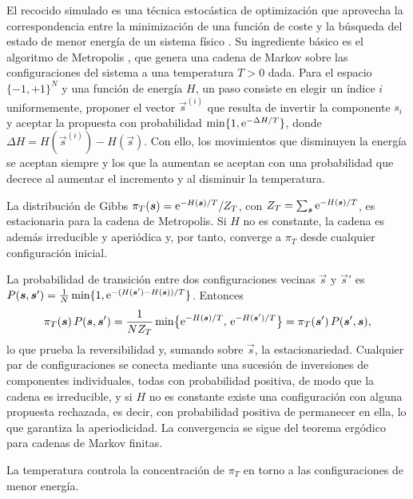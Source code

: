 El recocido simulado es una técnica estocástica de optimización que aprovecha la correspondencia entre la minimización de una función de coste y la búsqueda del estado de menor energía de un sistema físico \parencite{kirkpatrick1983}. Su ingrediente básico es el algoritmo de Metropolis \parencite{metropolis1953}, que genera una cadena de Markov sobre las configuraciones del sistema a una temperatura $T > 0$ dada. Para el espacio $\{-1,+1\}^N$ y una función de energía $H$, un paso consiste en elegir un índice $i$ uniformemente, proponer el vector $\vec{s}^{(i)}$ que resulta de invertir la componente $s_i$ y aceptar la propuesta con probabilidad $\min\{1, \mathrm{e}^{-\Delta H/T}\}$, donde $\Delta H = H(\vec{s}^{(i)}) - H(\vec{s})$. Con ello, los movimientos que disminuyen la energía se aceptan siempre y los que la aumentan se aceptan con una probabilidad que decrece al aumentar el incremento y al disminuir la temperatura.

\begin{theorem}\label{thm:metropolis}
La distribución de Gibbs $\pi_T(\boldsymbol{s}) = \mathrm{e}^{-H(\boldsymbol{s})/T}/Z_T$, con $Z_T = \sum_{\boldsymbol{s}} \mathrm{e}^{-H(\boldsymbol{s})/T}$, es estacionaria para la cadena de Metropolis. Si $H$ no es constante, la cadena es además irreducible y aperiódica y, por tanto, converge a $\pi_T$ desde cualquier configuración inicial.
\end{theorem}

\begin{demostracion}
La probabilidad de transición entre dos configuraciones vecinas $\vec{s}$ y $\vec{s}'$ es $P(\boldsymbol{s}, \boldsymbol{s}') = \tfrac{1}{N}\min\{1, \mathrm{e}^{-(H(\boldsymbol{s}') - H(\boldsymbol{s}))/T}\}$. Entonces
\[
    \pi_T(\boldsymbol{s})\,P(\boldsymbol{s}, \boldsymbol{s}') = \frac{1}{N Z_T}\min\bigl\{\mathrm{e}^{-H(\boldsymbol{s})/T},\, \mathrm{e}^{-H(\boldsymbol{s}')/T}\bigr\} = \pi_T(\boldsymbol{s}')\,P(\boldsymbol{s}', \boldsymbol{s}),
\]
lo que prueba la reversibilidad y, sumando sobre $\vec{s}$, la estacionariedad. Cualquier par de configuraciones se conecta mediante una sucesión de inversiones de componentes individuales, todas con probabilidad positiva, de modo que la cadena es irreducible, y si $H$ no es constante existe una configuración con alguna propuesta rechazada, es decir, con probabilidad positiva de permanecer en ella, lo que garantiza la aperiodicidad. La convergencia se sigue del teorema ergódico para cadenas de Markov finitas.
\end{demostracion}

La temperatura controla la concentración de $\pi_T$ en torno a las configuraciones de menor energía.

